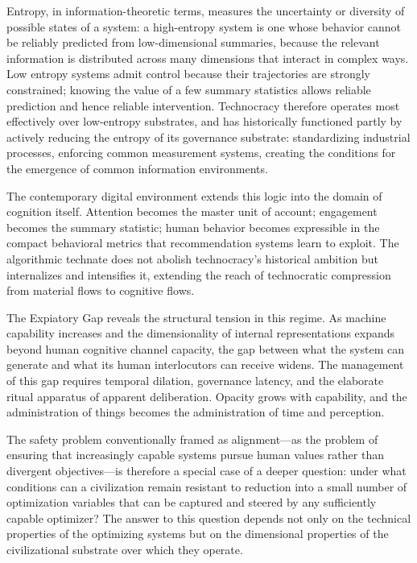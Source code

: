 \documentclass[12pt]{article}
\begin{document}
Entropy, in information-theoretic terms, measures the uncertainty or diversity of possible states of a system: a high-entropy system is one whose behavior cannot be reliably predicted from low-dimensional summaries, because the relevant information is distributed across many dimensions that interact in complex ways. Low entropy systems admit control because their trajectories are strongly constrained; knowing the value of a few summary statistics allows reliable prediction and hence reliable intervention. Technocracy therefore operates most effectively over low-entropy substrates, and has historically functioned partly by actively reducing the entropy of its governance substrate: standardizing industrial processes, enforcing common measurement systems, creating the conditions for the emergence of common information environments.

The contemporary digital environment extends this logic into the domain of cognition itself. Attention becomes the master unit of account; engagement becomes the summary statistic; human behavior becomes expressible in the compact behavioral metrics that recommendation systems learn to exploit. The algorithmic technate does not abolish technocracy's historical ambition but internalizes and intensifies it, extending the reach of technocratic compression from material flows to cognitive flows.

The Expiatory Gap reveals the structural tension in this regime. As machine capability increases and the dimensionality of internal representations expands beyond human cognitive channel capacity, the gap between what the system can generate and what its human interlocutors can receive widens. The management of this gap requires temporal dilation, governance latency, and the elaborate ritual apparatus of apparent deliberation. Opacity grows with capability, and the administration of things becomes the administration of time and perception.

The safety problem conventionally framed as alignment---as the problem of ensuring that increasingly capable systems pursue human values rather than divergent objectives---is therefore a special case of a deeper question: under what conditions can a civilization remain resistant to reduction into a small number of optimization variables that can be captured and steered by any sufficiently capable optimizer? The answer to this question depends not only on the technical properties of the optimizing systems but on the dimensional properties of the civilizational substrate over which they operate.
\end{document}
